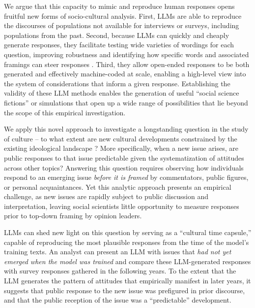\documentclass{article} %
\begin{document}
We argue that this capacity to mimic and reproduce human responses opens
fruitful new forms of socio-cultural analysis. First, LLMs are able to
reproduce the discourses of populations not available for interviews or
surveys, including populations from the past. Second, because LLMs can
quickly and cheaply generate responses, they facilitate testing wide
varieties of wordings for each question, improving robustness and
identifying how specific words and associated framings can steer
responses \parencite{Garcia-Pardina2022-cx}. Third, they allow open-ended responses to be both generated
and effectively machine-coded at scale, enabling a high-level view into
the system of considerations that inform a given response. Establishing
the validity of these LLM methods enables the generation of useful
``social science fictions'' or simulations that open up a wide range of
possibilities that lie beyond the scope of this empirical investigation.

We apply this novel approach to investigate a longstanding question in
the study of culture -- to what extent are new cultural developments
constrained by the existing ideological landscape
\parencite{Converse1964-kv, DellaPosta2020-ta, Hunzaker2019-ds}? More specifically, when
a new issue arises, are public responses to that issue predictable given
the systematization of attitudes across other topics? Answering this
question requires observing how individuals respond to an emerging issue
\emph{before it is framed} by commentators, public figures, or personal
acquaintances. Yet this analytic approach presents an empirical
challenge, as new issues are rapidly subject to public discussion and
interpretation, leaving social scientists little opportunity to measure
responses prior to top-down framing by opinion leaders.

LLMs can shed new light on this question by serving as a ``cultural time
capsule,'' capable of reproducing the most plausible responses from the
time of the model's training texts. An analyst can present an LLM with
issues that \emph{had not yet emerged when the model was trained} and
compare these LLM-generated responses with survey responses gathered in
the following years. To the extent that the LLM generates the pattern of
attitudes that empirically manifest in later years, it suggests that
public response to the new issue was prefigured in prior discourse, and
that the public reception of the issue was a ``predictable''
development.
\end{document}
